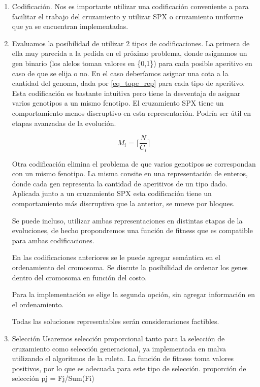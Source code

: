 \documentclass[9pt,conference]{IEEEtran}
\begin{document}
	\begin{enumerate}
		\item Codificaci\'on.
		Nos es importante utilizar una codificación conveniente a para facilitar el trabajo del cruzamiento y utilizar SPX o cruzamiento uniforme que ya se encuentran implementadas.

		\item Evaluamos la posibilidad de utilizar 2 tipos de codificaciones.
			La primera de ella muy parecida a la pedida en el próximo problema, donde asignamos un gen binario (los alelos toman valores en \{0,1\}) para cada posible aperitivo en caso de que se elija o no. En el caso deberíamos asignar una cota a la cantidad del genoma, dada por \ref{eq_tope_rep} para cada tipo de aperitivo. Esta codificación es bastante intuitiva pero tiene la desventaja de asignar varios genotipos a un mismo fenotipo. El cruzamiento SPX tiene un comportamiento menos discruptivo en esta representación. Podría ser útil en etapas avanzadas de la evolución.

			\begin{equation}
			\label{eqn_tope_req}
			M_i = \lceil \frac{N}{C_i} \rceil
			\end{equation}

			Otra codificación elimina el problema de que varios genotipos se correspondan con un mismo fenotipo. La misma consite en una representación de enteros, donde cada gen representa la cantidad de aperitivos de un tipo dado. Aplicada junto a un cruzamiento SPX esta codificación tiene un comportamiento más discruptivo que la anterior, se mueve por bloques.

			Se puede incluso, utilizar ambas representaciones en distintas etapas de la evoluciones, de hecho propondremos una función de fitness que es {compatible} para ambas codificaciones.

			En las codificaciones anteriores se le puede agregar semántica en el ordenamiento del cromosoma. Se discute la posibilidad de ordenar los genes dentro del cromosoma en función del costo.

			Para la implementación se elige la segunda opción, sin agregar información en el ordenamiento.
		
		Todas las soluciones representables serán consideraciones factibles.

	\item Selección
		Usaremos selección proporcional tanto para la selección de cruzamiento como selección generacional, ya implementada en malva utilizando el algoritmos de la ruleta. La función de fitness toma valores positivos, por lo que es adecuada para este tipo de selección.
		proporción de selección
		pj = Fj/Sum(Fi)


\end{enumerate}
\end{document}
